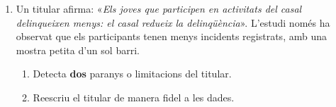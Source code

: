 \begin{enumerate}[label=\textbf{\arabic*.}, leftmargin=2em, itemsep=7pt, start=4]
  \item Un titular afirma: «\emph{Els joves que participen en activitats del casal
        delinqueixen menys: el casal redueix la delinqüència}». L'estudi només ha observat
        que els participants tenen menys incidents registrats, amb una mostra petita d'un
        sol barri.
        \begin{enumerate}[label=\alph*), leftmargin=1.6em, topsep=2pt, itemsep=2pt]
          \item Detecta \textbf{dos} paranys o limitacions del titular.
          \item Reescriu el titular de manera fidel a les dades.
        \end{enumerate}
\end{enumerate}

